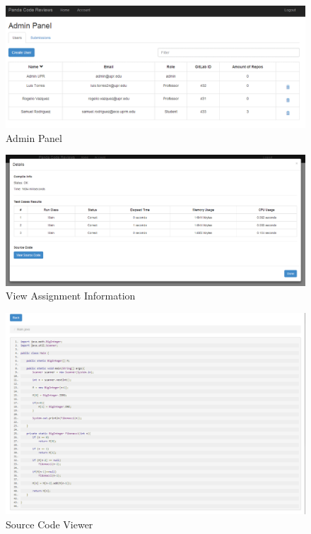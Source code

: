 \begin{figure}[H]
	\centering
	\includegraphics[width=\textwidth]{img/adminPanel-screen}
	\caption{Admin Panel}
\end{figure}

\begin{figure}[H]
	\centering
	\includegraphics[width=\textwidth]{img/assigninfo-screen}
	\caption{View Assignment Information}
\end{figure}

\begin{figure}[H]
	\centering
	\includegraphics[width=\textwidth]{img/sourceviewer-screen}
	\caption{Source Code Viewer}
\end{figure}

